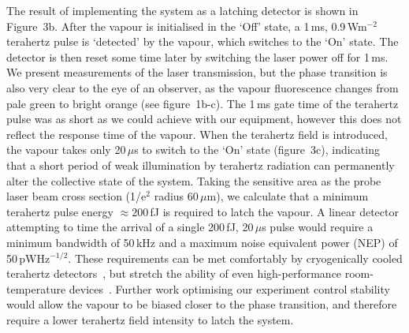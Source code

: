 \documentclass[twocolumn,aps,prl,nobibnotes,8pt]{revtex4-1}
\begin{document}
The result of implementing the system as a latching detector is shown in Figure~3b.
After the vapour is initialised in the `Off' state, a 1\,ms, 0.9\,Wm$^{-2}$ terahertz pulse is `detected' by the vapour, which switches to the `On' state. 
The detector is then reset some time later by switching the laser power off for 1\,ms.
We present measurements of the laser transmission, but the phase transition is also very clear to the eye of an observer, as the vapour fluorescence changes from pale green to bright orange (see figure~1b-c). 
The 1\,ms gate time of the terahertz pulse was as short as we could achieve with our equipment, however this does not reflect the response time of the vapour.
When the terahertz field is introduced, the vapour takes only 20\,$\mu$s to switch to the `On' state (figure~3c), indicating that a short period of weak illumination by terahertz radiation can permanently alter the collective state of the system.
Taking the sensitive area as the probe laser beam cross section (1/e$^2$ radius 60\,$\mu$m), we calculate that a minimum terahertz pulse energy $\approx 200$\,fJ is required to latch the vapour. 
A linear detector attempting to time the arrival of a single 200\,fJ, 20\,$\mu$s pulse would require a minimum bandwidth of 50\,kHz and a maximum noise equivalent power (NEP) of 50\,pWHz$^{-1/2}$.
These requirements can be met comfortably by cryogenically cooled terahertz detectors~\cite{Sizov10}, but stretch the ability of even high-performance room-temperature devices~\cite{Qin17,He14,Vitiello11,Cai14}. 
Further work optimising our experiment control stability would allow the vapour to be biased closer to the phase transition, and therefore require a lower terahertz field intensity to latch the system. 
\end{document}
